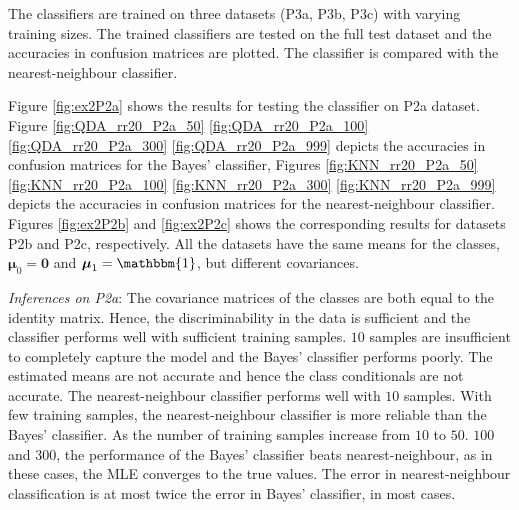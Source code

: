 \documentclass[11pt, a4 paper]{article}
\newcommand{\bmu}{\boldsymbol{\mu}}
\begin{document}
The classifiers are trained on three datasets (P3a, P3b, P3c) with varying training sizes. The trained classifiers are tested on the full test dataset and the accuracies in confusion matrices are plotted. The classifier is compared with the nearest-neighbour classifier.

Figure \ref{fig:ex2P2a} shows the results for testing the classifier on P2a dataset. Figure \ref{fig:QDA_rr20_P2a_50} \ref{fig:QDA_rr20_P2a_100} \ref{fig:QDA_rr20_P2a_300} \ref{fig:QDA_rr20_P2a_999} depicts the accuracies in confusion matrices for the Bayes' classifier, Figures \ref{fig:KNN_rr20_P2a_50} \ref{fig:KNN_rr20_P2a_100} \ref{fig:KNN_rr20_P2a_300} \ref{fig:KNN_rr20_P2a_999} depicts the accuracies in confusion matrices for the nearest-neighbour classifier. Figures \ref{fig:ex2P2b} and \ref{fig:ex2P2c} shows the corresponding results for datasets P2b and P2c, respectively. All the datasets have the same means for the classes, $\bmu_{0} = \boldsymbol{0}$ and $\bmu_{1} = \mathbbm{1}$, but different covariances.

{\it Inferences on P2a}: The covariance matrices of the classes are both equal to the identity matrix. Hence, the discriminability in the data is sufficient and the classifier performs well with sufficient training samples. $10$ samples are insufficient to completely capture the model and the Bayes' classifier performs poorly. The estimated means are not accurate and hence the class conditionals are not accurate. The nearest-neighbour classifier performs well with $10$ samples. With few training samples, the nearest-neighbour classifier is more reliable than the Bayes' classifier. As the number of training samples increase from $10$ to $50$. $100$ and $300$, the performance of the Bayes' classifier beats nearest-neighbour, as in these cases, the MLE converges to the true values. The error in nearest-neighbour classification is at most twice the error in Bayes' classifier, in most cases.
\end{document}
